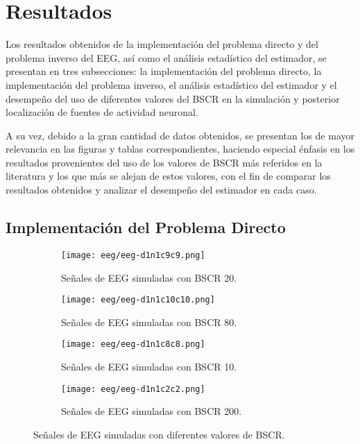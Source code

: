 %
\chapter{Resultados}
\label{sec:results}

Los resultados obtenidos de la implementación del problema directo y del problema inverso del EEG, así como el análisis estadístico del estimador, se presentan en tres subsecciones: la implementación del problema directo, la implementación del problema inverso, el análisis estadístico del estimador y el desempeño del uso de diferentes valores del BSCR en la simulación y posterior localización de fuentes de actividad neuronal.

A su vez, debido a la gran cantidad de datos obtenidos, se presentan los de mayor relevancia en las figuras y tablas correspondientes, haciendo especial énfasis en los resultados provenientes del uso de los valores de BSCR más referidos en la literatura y los que más se alejan de estos valores, con el fin de comparar los resultados obtenidos y analizar el desempeño del estimador en cada caso.

\section{Implementación del Problema Directo}
\label{sec:results:direct}

\begin{figure}[hp]
    \centering
    \begin{subfigure}{0.9\textwidth}
        \texttt{[image: eeg/eeg-d1n1c9c9.png]}
        \caption{Señales de EEG simuladas con BSCR 20.}
        \label{fig:eeg-d1n1c9c9}
        \vspace{0.5em}
    \end{subfigure}
    \vfill
    \begin{subfigure}{0.9\textwidth}
        \texttt{[image: eeg/eeg-d1n1c10c10.png]}
        \caption{Señales de EEG simuladas con BSCR 80.}
        \label{fig:eeg-d1n1c10c10}
        \vspace{0.5em}
    \end{subfigure}
    \vfill
    \begin{subfigure}{0.9\textwidth}
        \texttt{[image: eeg/eeg-d1n1c8c8.png]}
        \caption{Señales de EEG simuladas con BSCR 10.}
        \label{fig:eeg-d1n1c8c8}
        \vspace{0.5em}
    \end{subfigure}
    \vfill
    \begin{subfigure}{0.9\textwidth}
        \texttt{[image: eeg/eeg-d1n1c2c2.png]}
        \caption{Señales de EEG simuladas con BSCR 200.}
        \label{fig:eeg-d1n1c2c2}
    \end{subfigure}
    \caption{Señales de EEG simuladas con diferentes valores de BSCR.}
    \label{fig:eeg-simulated}
\end{figure}

